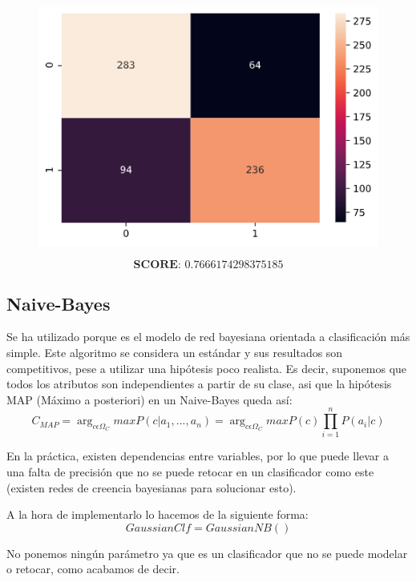 \documentclass[11pt,a4paper]{article}
\begin{document}
\begin{figure}[H]
    \centering
    \includegraphics[scale=0.5]{img/matrix-tree.png}    
\end{figure}
$$\textbf{SCORE:  } 0.7666174298375185$$


\subsection{Naive-Bayes}
Se ha utilizado porque es el modelo de red bayesiana orientada a clasificación más simple. Este algoritmo se considera un
estándar y sus resultados son competitivos, pese a utilizar una hipótesis poco realista. Es decir, suponemos que todos los
atributos son independientes a partir de su clase, asi que la hipótesis MAP (Máximo a posteriori) en un Naive-Bayes queda así:
$$C_{MAP} = \arg _{c\epsilon \Omega_C}maxP(c|a_1,...,a_n) = \arg _{c\epsilon \Omega_C}maxP(c)\prod_{i=1}^{n}P(a_i|c)$$

En la práctica, existen dependencias entre variables, por lo que puede llevar a una falta de precisión que no se puede retocar
en un clasificador como este (existen redes de creencia bayesianas para solucionar esto).

A la hora de implementarlo lo hacemos de la siguiente forma:
$$GaussianClf = GaussianNB()$$

No ponemos ningún parámetro ya que es un clasificador que no se puede modelar o retocar, como acabamos de decir.
\end{document}
